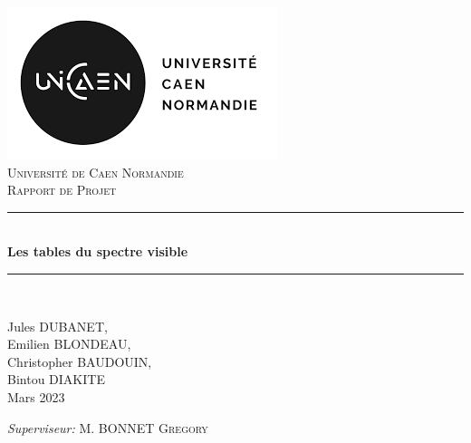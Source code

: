 \documentclass[french,12pt]{article}
\newcommand{\HRule}{\rule{\linewidth}{0.5mm}}
\begin{document}
\begin{titlepage}
  \begin{sffamily}
  \begin{center}

    \includegraphics[scale=0.94]{unicaen.png}~\\[1.5cm]

    \textsc{\LARGE Université de Caen Normandie}\\[2cm]

    \textsc{\Large Rapport de Projet}\\[1.5cm]

    \HRule \\[0.4cm]
    { \huge \bfseries Les tables du spectre visible\\[0.4cm] }

    \HRule \\[2cm]


    \begin{minipage}{0.4\textwidth}
      \begin{flushleft} \large
        Jules DUBANET,\\ Emilien BLONDEAU,\\ Christopher BAUDOUIN,\\ Bintou DIAKITE\\
        Mars 2023\\
      \end{flushleft}
    \end{minipage}
    \begin{minipage}{0.4\textwidth}
      \begin{flushright} \large
        \emph{Superviseur:} M. BONNET \textsc{Gregory}\\
        
      \end{flushright}
    \end{minipage}

  \end{center}
  \end{sffamily}
\end{titlepage}
\end{document}
